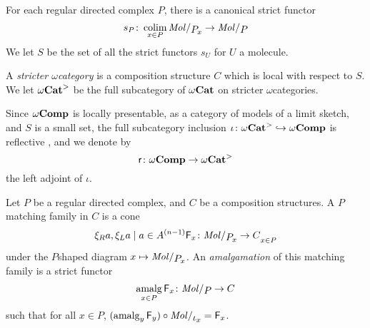 \noindent For each regular directed complex \( P \), there is a canonical strict functor
\begin{equation*}
    s_P \colon \colim_{x \in P} \molecin{\imel{P}{x}} \to \molecin{P}
\end{equation*}
We let \( S \) be the set of all the strict functors \( s_U \) for \( U \) a molecule.

\begin{dfn}
    A \emph{stricter \( \omega \)\nbd category} is a composition structure \( C \) which is local with respect to \( S \).
    We let \( {\omega\mathbf{Cat}}^> \) be the full subcategory of \( {\omega\mathbf{Cat}} \) on stricter \( \omega \)\nbd categories.
\end{dfn}

\noindent Since \( \omega\mathbf{Comp} \) is locally presentable, as a category of models of a limit sketch, and \( S \) is a small set, the full subcategory inclusion \( \iota \colon {\omega\mathbf{Cat}}^> \hookrightarrow \omega\mathbf{Comp} \) is reflective \cite{freyd1972continuous}, and we denote by 
\begin{equation*}
    \mathsf{r} \colon \omega\mathbf{Comp} \to {\omega\mathbf{Cat}}^>
\end{equation*}
the left adjoint of \( \iota \).

\begin{dfn} 
    Let \( P \) be a regular directed complex, and \( C \) be a composition structures.
    A \( P \)\nbd matching family in \( C \) is a cone 
    \begin{equation*}
        \set{\F_x \colon \molecin{\imel{P}{x}} \to C}_{x \in P}
    \end{equation*}
    under the \( P \)\nbd shaped diagram \( x \mapsto \molecin{\imel{P}{x}} \).    
    An \emph{amalgamation} of this matching family is a strict functor 
    \begin{equation*}
        \amalg_{x\in P} \F_x \colon \molecin{P} \to C
    \end{equation*}
    such that for all \( x \in P \), \( (\amalg_y \F_y) \after \molecin{\mapel{x}} = \F_x \).
\end{dfn}

